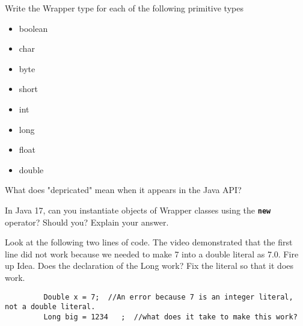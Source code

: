 \documentclass[letterpaper,12pt]{exam}
\begin{document}
\begin{questions}
\begin{samepage}
    \question Write the Wrapper type for each of the following primitive types
      \begin{itemize}
        \item boolean
        \vspace{5mm}
        \item char
        \vspace{5mm}
        \item byte
        \vspace{5mm}
        \item short 
        \vspace{5mm}
        \item int
        \vspace{5mm}
        \item long
        \vspace{5mm}
        \item float
        \vspace{5mm}
        \item double
        \vspace{5mm}
       \end{itemize}
\end{samepage}

\begin{samepage}
    \question What does "depricated" mean when it appears in the Java API?
    \vspace{5mm}
\end{samepage}

\begin{samepage}
    \question In Java 17, can you instantiate objects of Wrapper classes using the \texttt{\textbf{new}} operator?  Should you?  Explain your answer.
    \vspace{5mm}
\end{samepage}

\begin{samepage}
    \question Look at the following two lines of code.  The video demonstrated that the first line did not work because we needed to make 7 into a double literal as 7.0.  Fire up Idea.  Does the declaration of the Long work?  Fix the literal so that it does work.
    \begin{verbatim}
         Double x = 7;  //An error because 7 is an integer literal, not a double literal.        
         Long big = 1234   ;  //what does it take to make this work?
        \end{verbatim}
    \vspace{5mm}
\end{samepage}



\end{questions}
\end{document}

